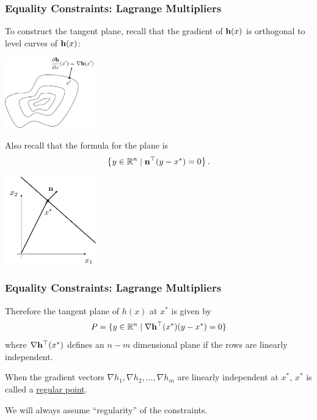 \documentclass{beamer}
\begin{document}
\begin{frame}\frametitle{Equality Constraints: Lagrange Multipliers}
	To construct the tangent plane, recall that the gradient of $\mathbf{h}(x)$ is orthogonal to level curves of $\mathbf{h}(x)$:
	\begin{center}
		\includegraphics[width=0.3\textwidth]
			{figures/chap18_gradient_h}
	\end{center}	
	Also recall that the formula for the plane is
	\[
		\left\{ y\in \mathbb{R}^n \mid \mathbf{n}^\top (y-x^{\ast})=0 \right\}.
	\]
	\begin{center}
		\includegraphics[width=0.3\textwidth]
			{figures/chap18_line}
	\end{center}
\end{frame}

\begin{frame}\frametitle{Equality Constraints: Lagrange Multipliers}
	Therefore the tangent plane of $h(x)$ at $x^{\ast}$ is given by
	\[ 
		P = \{ y\in \mathbb{R}^n \mid \nabla \mathbf{h}^\top (x^{\ast})(y-x^{\ast}) =0 \} 
	\]
	where $\nabla \mathbf{h}^\top (x^{\ast})$ defines an $n-m$ dimensional plane if the rows are linearly independent.

	\begin{definition}
		When the gradient vectors $\nabla h_1, \nabla h_2, \ldots, \nabla h_m$ are linearly independent at $x^{\ast}$, $x^{\ast}$ is called a \underline{regular point}.	 
	\end{definition}

	\vfill
	
	We will always assume ``regularity'' of the constraints.
\end{frame}
	
\end{document}

